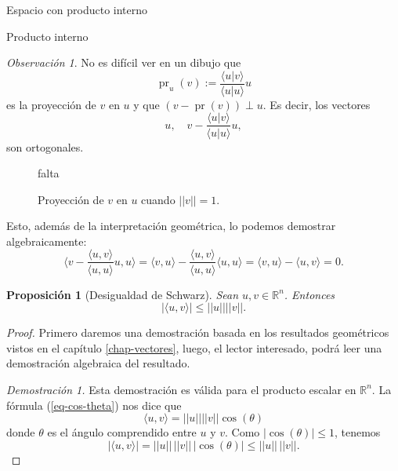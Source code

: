 \documentclass[a4paper,12pt,twoside,spanish,reqno]{amsbook}
\newtheorem{proposicion}[teorema]{Proposici\'on}
\theoremstyle{definition}
\theoremstyle{remark}
\newtheorem{observacion}{Observaci\'on}[section]
\newcommand{\la}{\langle}
\newcommand{\ra}{\rangle}
\newcommand{\R}{\mathbb R}
\begin{document}
\begin{chapter}{Espacio con producto interno}
\begin{section}{Producto interno}
        \medskip
        
        \begin{observacion}\label{obs-proyeccion-ort}
            No es difícil ver en un dibujo que 
            \begin{equation*}
                \operatorname{pr}_u(v) := \frac{\la u|v\ra}{\la u|u\ra}u
            \end{equation*}
             es la proyección de $v$ en $u$ y que   $(v - \operatorname{pr}(v)) \perp u$. Es decir,   los vectores
            \begin{equation*}
                    u, \quad   v - \frac{\la u|v\ra}{\la u|u\ra}u,
            \end{equation*}
            son ortogonales.
            \begin{figure}[h]
                falta
                \caption{Proyección de $v$ en $u$ cuando $||v||=1$.}\label{fig-proyeccion-ort}
            \end{figure}
        
        
            Esto,  además de la interpretación geométrica, lo podemos demostrar algebraicamente:
            \begin{equation*}
            \la v - \frac{\la u,v\ra}{\la u,u\ra} u , u \ra =
            \la v , u \ra  -\frac{\la u,v\ra}{\la u,u\ra}\la u , u \ra =  \la v , u \ra -  \la u , v \ra =0.
            \end{equation*}
            
        \end{observacion}
        
        \begin{proposicion}[Desigualdad de Schwarz] Sean $u, v\in \R^n$. Entonces 
            $$|\la u, v \ra| \le ||u||||v||.$$
        \end{proposicion}
        \begin{proof} Primero daremos una demostración basada en los resultados geométricos vistos en el capítulo \ref{chap-vectores}, luego,  el lector interesado, podrá leer una demostración algebraica del resultado. 
        
        \textit{Demostración 1.} Esta demostración es válida para el producto escalar en $\R^n$. La fórmula (\ref{eq-cos-theta}) nos dice que 
        \begin{equation*}
            \la u, v \ra = ||u||||v||\cos(\theta)
        \end{equation*}
        donde $\theta$ es el ángulo comprendido entre $u$ y $v$. Como $|\cos(\theta)| \le 1$,  tenemos
        \begin{equation*}
            |\la u, v \ra| = ||u||\,||v||\,|\cos(\theta)| \le  ||u||\,||v||.
        \end{equation*}
        

\end{proof}
\end{section}
\end{chapter}
\end{document}

